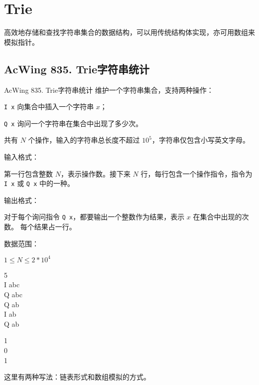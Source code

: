 \begin{mycpptwocol}[KMP]

\end{mycpptwocol}


\section{Trie}
高效地存储和查找字符串集合的数据结构，可以用传统结构体实现，亦可用数组来模拟指针。

\subsection{AcWing 835. Trie字符串统计}

\begin{titledbox}{AcWing 835. Trie字符串统计}
    维护一个字符串集合，支持两种操作：

    \lstinline{I x} 向集合中插入一个字符串 $x$；

    \lstinline{Q x} 询问一个字符串在集合中出现了多少次。

    共有 $N$ 个操作，输入的字符串总长度不超过 $10^5$，字符串仅包含小写英文字母。

    输入格式：

    第一行包含整数 $N$，表示操作数。接下来 $N$ 行，每行包含一个操作指令，指令为 \lstinline{I x} 或 \lstinline{Q x} 中的一种。

    输出格式：

    对于每个询问指令 \lstinline{Q x}，都要输出一个整数作为结果，表示 $x$ 在集合中出现的次数。
    每个结果占一行。

    数据范围：

    $1 \le N \le 2*10^4$

    \begin{inputblock}
        5 \\
        I abc \\
        Q abc \\
        Q ab \\
        I ab \\
        Q ab
    \end{inputblock}
    \begin{outputblock}
        1 \\
        0 \\
        1
    \end{outputblock}
\end{titledbox}

这里有两种写法：链表形式和数组模拟的方式。

